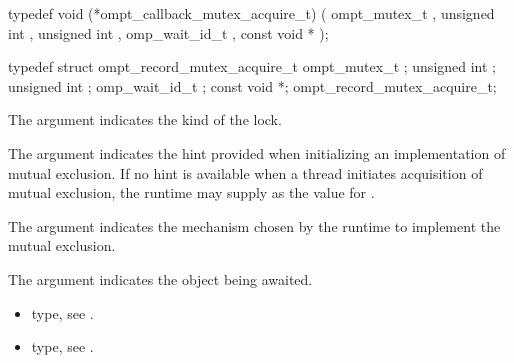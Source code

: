 \label{sec:ompt_callback_mutex_acquire_t}
\format

\begin{ccppspecific}
\begin{omptCallback}
typedef void (*ompt_callback_mutex_acquire_t) (
  ompt_mutex_t ,
  unsigned int ,
  unsigned int ,
  omp_wait_id_t ,
  const void *
);
\end{omptCallback}
\end{ccppspecific}


\record

\begin{ccppspecific}
\begin{omptRecord}
typedef struct ompt_record_mutex_acquire_t {
  ompt_mutex_t ;
  unsigned int ;
  unsigned int ;
  omp_wait_id_t ;
  const void *;
} ompt_record_mutex_acquire_t;
\end{omptRecord}
\end{ccppspecific}


\argdesc

The argument  indicates the kind of the lock.

The argument  indicates the hint provided when initializing
an implementation of mutual exclusion.
If no hint is available when a thread initiates acquisition of mutual exclusion,
the runtime may supply  as the value for .

The argument  indicates the mechanism chosen by the
runtime to implement the mutual exclusion.

The argument  indicates the object being awaited.

\codeptrdesc

\crossreferences
\begin{itemize}
\item {} type, see
.
\item {} type, see
.
\end{itemize}



\label{sec:ompt_callback_mutex_t}
\format

